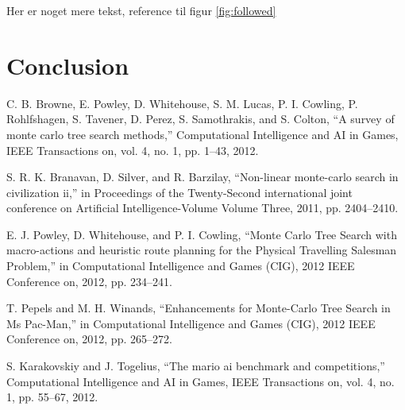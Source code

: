 \documentclass[10pt,a4paper]{article}
\begin{document}
Her er noget mere tekst, reference til figur \ref{fig:followed}
\clearpage
\section{Conclusion}
\clearpage

\begin{thebibliography}{9}
  C. B. Browne, E. Powley, D. Whitehouse, S. M. Lucas, P. I. Cowling, P. Rohlfshagen, S. Tavener, D. Perez, S. Samothrakis, and S. Colton, “A survey of monte carlo tree search methods,” Computational Intelligence and AI in Games, IEEE Transactions on, vol. 4, no. 1, pp. 1–43, 2012.

S. R. K. Branavan, D. Silver, and R. Barzilay, “Non-linear monte-carlo search in civilization ii,” in Proceedings of the Twenty-Second international joint conference on Artificial Intelligence-Volume Volume Three, 2011, pp. 2404–2410.

E. J. Powley, D. Whitehouse, and P. I. Cowling, “Monte Carlo Tree Search with macro-actions and heuristic route planning for the Physical Travelling Salesman Problem,” in Computational Intelligence and Games (CIG), 2012 IEEE Conference on, 2012, pp. 234–241.

T. Pepels and M. H. Winands, “Enhancements for Monte-Carlo Tree Search in Ms Pac-Man,” in Computational Intelligence and Games (CIG), 2012 IEEE Conference on, 2012, pp. 265–272.

S. Karakovskiy and J. Togelius, “The mario ai benchmark and competitions,” Computational Intelligence and AI in Games, IEEE Transactions on, vol. 4, no. 1, pp. 55–67, 2012.

\end{thebibliography}
\end{document}
